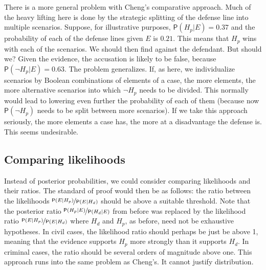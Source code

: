 \documentclass[
  10pt,
  dvipsnames,enabledeprecatedfontcommands]{scrartcl}
\newcommand{\n}{\neg}
\newcommand{\pr}[1]{\ensuremath{\mathsf{P}(#1)}}
\begin{document}
There is a more general problem with Cheng's comparative approach. Much
of the heavy lifting here is done by the strategic splitting of the
defense line into multiple scenarios. Suppose, for illustrative
purposes, \(\pr{H_p\vert E}=0.37\) and the probability of each of the
defense lines given \(E\) is \(0.21\). This means that \(H_p\) wins with
each of the scenarios. We should then find against the defendant. But
should we? Given the evidence, the accusation is likely to be false,
because \(\pr{\n H_p \vert E}=0.63\). The problem generalizes. If, as
here, we individualize scenarios by Boolean combinations of elements of
a case, the more elements, the more alternative scenarios into which
\(\n H_p\) needs to be divided. This normally would lead to lowering
even further the probability of each of them (because now
\(\pr{\n H_p}\) needs to be split between more scenarios). If we take
this approach seriously, the more elements a case has, the more at a
disadvantage the defense is. This seems undesirable.

\hypertarget{comparing-likelihoods}{%
\subsection{Comparing likelihoods}\label{comparing-likelihoods}}

Instead of posterior probabilities, we could consider comparing
likelihoods and their ratios. The standard of proof would then be as
follows: the ratio between the likelihoods
\(\nicefrac{\pr{E \vert H_p}}{\pr{E \vert H_d}}\) should be above a
suitable threshold. Note that the posterior ratio
\(\nicefrac{\pr{H_p \vert E}}{\pr{H_d \vert E}}\) from before was
replaced by the likelihood ratio
\(\nicefrac{\pr{E \vert H_p}}{\pr{E \vert H_d}}\) where \(H_d\) and
\(H_p\), as before, need not be exhaustive hypotheses. In civil cases,
the likelihood ratio should perhaps be just be above 1, meaning that the
evidence supports \(H_p\) more strongly than it supports \(H_d\). In
criminal cases, the ratio should be several orders of magnitude above
one. This approach runs into the same problem as Cheng's. It cannot
justify distribution.
\end{document}

